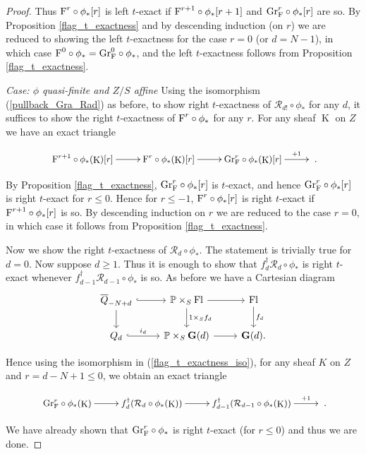 \documentclass[12pt, reqno]{amsart}
\theoremstyle{plain}
\theoremstyle{definition}
\theoremstyle{definition}
\newcommand{\bbP}{{\mathbb P}}
\newcommand{\bG}{{\bf G}}
\newcommand{\cR}{{\mathcal R}}
\DeclareMathOperator{\KK}{K}
\begin{document}
\begin{proof}
Thus $\textup{F}^{r}\circ \phi_{*}[r]$ is left $t$-exact if $\textup{F}^{r+1}\circ \phi_{*}[r+1]$ and $\textup{Gr}_\textup{F}^{r}\circ \phi_{*}[r]$ are so. By Proposition \ref{flag_t_exactness} and by descending induction (on $r$) we are reduced to showing the left $t$-exactness for the case $r=0$ (or $d=N-1$), in which case $\textup{F}^{0}\circ \phi_{*}=\textup{Gr}_\textup{F}^{0}\circ \phi_{*}$, and the left $t$-exactness follows from Proposition \ref{flag_t_exactness}.

\textit{Case: $\phi$ quasi-finite and $Z/S$ affine} \newline
Using the isomorphism (\ref{pullback_Gra_Rad}) as before, to show right $t$-exactness of $\cR_{d!} \circ \phi_{*}$ for any $d$, it suffices to show the right $t$-exactness of $\textup{F}^{r}\circ \phi_{*}$ for any $r$. For any sheaf $\KK$ on $Z$ we have an exact triangle

\[
 \small \xymatrix{\textup{F}^{r+1}\circ \phi_{*}(\KK)[r] \ar[r] & \textup{F}^{r}\circ \phi_{*}(\KK)[r] \ar[r] & \textup{Gr}_\textup{F}^{r}\circ \phi_{*}(\KK)[r] \ar^-{+1}[r]&}.
\]

By Proposition \ref{flag_t_exactness}, $\textup{Gr}_\textup{F}^{r}\circ \phi_{*}[r]$ is $t$-exact, and hence $\textup{Gr}_\textup{F}^{r}\circ \phi_{*}[r]$ is right $t$-exact for $r \leq 0$. Hence for $r \leq -1$, $\textup{F}^{r}\circ \phi_{*}[r]$ is right $t$-exact if $\textup{F}^{r+1}\circ \phi_{*}[r]$ is so. By descending induction on $r$ we are reduced to the case $r=0$, in which case it follows from Proposition \ref{flag_t_exactness}.

Now we show the right $t$-exactness of $\cR_{d} \circ \phi_{*}$. The statement is trivially true for $d=0$. Now suppose $d \geq 1$. Thus it is enough to show that $f_d^{\dagger}\cR_{d} \circ \phi_{*}$ is right $t$-exact whenever $f_{d-1}^{\dagger}\cR_{d-1} \circ \phi_{*}$ is so. As before we have a Cartesian diagram
\begin{equation}\label{Grass_Rad_Corollary_diagram2}
\begin{tikzcd}[row sep=normal, column sep=normal]
   \overline{Q}_{-N+d} \arrow[r,hook] \arrow[d] & \bbP \times_S \textup{Fl} \arrow[d,"1\times_S f_d"] \arrow[r] & \textup{Fl} \arrow[d,"f_d"] \\
    Q_{d} \arrow[r,hook,"i_{d}"] & \bbP \times_S \bG(d) \arrow[r] & \bG(d).
\end{tikzcd}
\end{equation}  


Hence using the isomorphism in (\ref{flag_t_exactness_iso}), for any sheaf $K$ on $Z$ and $r=d-N+1\leq 0$, we obtain an exact triangle 

\[
 \small \xymatrix{\textup{Gr}_\textup{F}^{r}\circ \phi_{*}(\KK) \ar[r] & f_d^{\dagger}(\cR_{d} \circ \phi_{*}(\KK))\ar[r] & f_{d-1}^{\dagger}(\cR_{d-1} \circ \phi_{*}(\KK)) \ar^-{+1}[r]&}.
\]

We have already shown that $\textup{Gr}_\textup{F}^{r}\circ \phi_{*}$ is right $t$-exact (for $r \leq 0$) and thus we are done. \end{proof}
\end{document}
